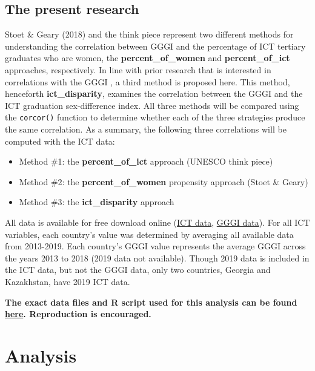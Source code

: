 \documentclass[]{book}
\providecommand{\tightlist}{%
  \setlength{\itemsep}{0pt}\setlength{\parskip}{0pt}}
\begin{document}
\section{The present research}\label{the-present-research-1}

Stoet \& Geary (2018) and the think piece represent two different
methods for understanding the correlation between GGGI and the
percentage of ICT tertiary graduates who are women, the
\textbf{percent\_of\_women} and \textbf{percent\_of\_ict} approaches,
respectively. In line with prior research that is interested in
correlations with the GGGI \citep{zentnerSteppingOutCaveman2012}, a
third method is proposed here. This method, henceforth
\textbf{ict\_disparity}, examines the correlation between the GGGI and
the ICT graduation sex-difference index. All three methods will be
compared using the \texttt{corcor()} function to determine whether each
of the three strategies produce the same correlation. As a summary, the
following three correlations will be computed with the ICT data:

\begin{itemize}
\tightlist
\item
  Method \#1: the \textbf{percent\_of\_ict} approach (UNESCO think
  piece)
\item
  Method \#2: the \textbf{percent\_of\_women} propensity approach (Stoet
  \& Geary)
\item
  Method \#3: the \textbf{ict\_disparity} approach
\end{itemize}

All data is available for free download online
(\href{http://data.uis.unesco.org/Index.aspx?DataSetCode=EDULIT_DS\&popupcustomise=true\&lang=en\#}{ICT
data},
\href{https://tcdata360-backend.worldbank.org/api/v1/datasets/743/dump.csv}{GGGI
data}). For all ICT variables, each country's value was determined by
averaging all available data from 2013-2019. Each country's GGGI value
represents the average GGGI across the years 2013 to 2018 (2019 data not
available). Though 2019 data is included in the ICT data, but not the
GGGI data, only two countries, Georgia and Kazakhstan, have 2019 ICT
data.

\textbf{The exact data files and R script used for this analysis can be
found
\href{https://github.com/mandydavis/ict-gep-re-analysis/tree/master/data-\&-R-script}{here}.
Reproduction is encouraged.}

\chapter{Analysis}\label{analysis}
\end{document}
